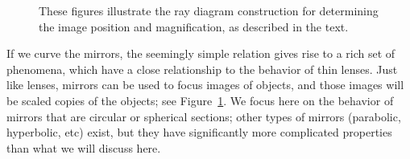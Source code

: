 \documentclass[12pt]{article}
\begin{document}
\begin{figure}
  \centering
  \caption{These figures illustrate the ray diagram construction for
    determining the image position and magnification, as described in
    the text.}
  \label{fig:mirrors}
\end{figure}
If we curve the mirrors, the seemingly simple relation gives rise to a
rich set of phenomena, which have a close relationship to the behavior
of thin lenses.  Just like lenses, mirrors can be used to focus images
of objects, and those images will be scaled copies of the objects; see
Figure~\ref{fig:mirrors}.  We focus here on the behavior of mirrors
that are circular or spherical sections; other types of mirrors
(parabolic, hyperbolic, etc) exist, but they have significantly more
complicated properties than what we will discuss here.
\end{document}
